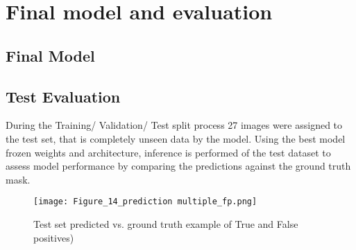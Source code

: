\chapter{Final model and evaluation}
\section{Final Model}

\section{Test Evaluation}

During the Training/ Validation/ Test split process 27 images were assigned to the test set, that is completely unseen data by the model. Using the best model frozen weights and architecture, inference is performed of the test dataset to assess model performance by comparing the predictions against the ground truth mask.

    \begin{figure}[hbt!]
        \centering
        \texttt{[image: Figure\_14\_prediction multiple\_fp.png]}
        \caption{Test set predicted vs. ground truth example of True and False positives)}
        \label{fig_tp_fp}
    \end{figure}

